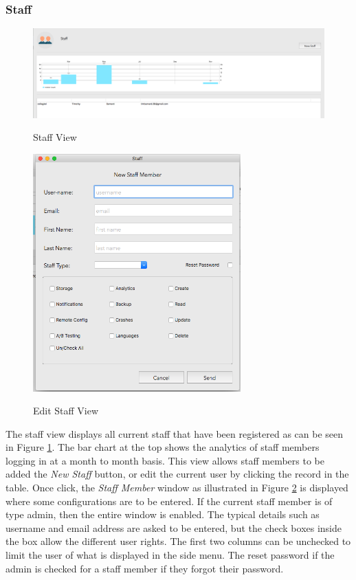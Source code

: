 \subsubsection{Staff}

\begin{figure}[!h]
    \caption{Staff View}
    \centering
    \includegraphics[width=120mm]{images/dashboard/staff}
    \label{fig:staff}
\end{figure} 

\begin{figure}[!h]
    \caption{Edit Staff View}
    \centering
    \includegraphics[width=80mm]{images/dashboard/edit_staff}
    \label{fig:edit_staff}
\end{figure} 

The staff view displays all current staff that have been registered as can be seen in Figure \ref{fig:staff}. The bar chart at the top shows the analytics of staff members logging in at a month to month basis. This view allows staff members to be added the \textit{New Staff} button, or edit the current user by clicking the record in the table. Once click, the \textit{Staff Member} window as illustrated in Figure \ref{fig:edit_staff} is displayed where some configurations are to be entered. If the current staff member is of type admin, then the entire window is enabled. The typical details such as username and email address are asked to be entered, but the check boxes inside the box allow the different user rights. The first two columns can be unchecked to limit the user of what is displayed in the side menu. The reset password if the admin is checked for a staff member if they forgot their password.

